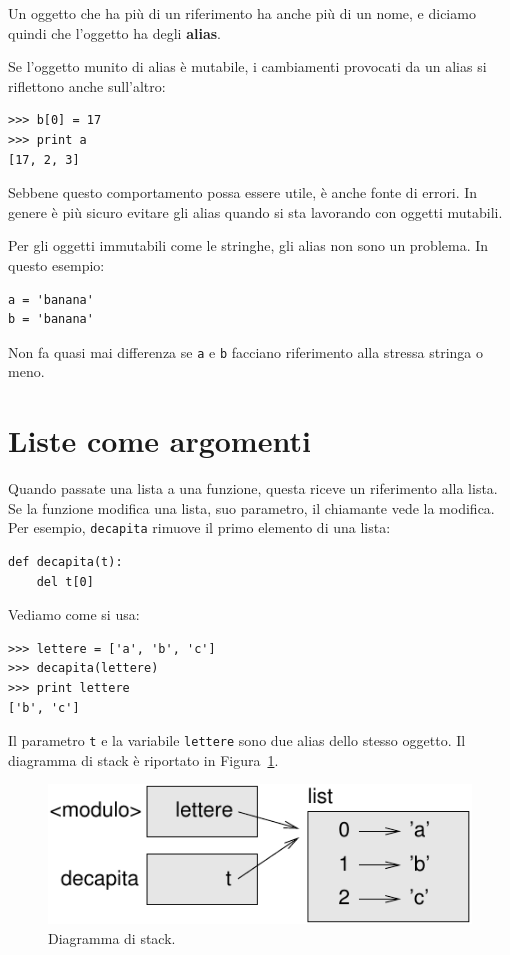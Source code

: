 \documentclass[10pt]{book}
\begin{document}
Un oggetto che ha più di un riferimento ha anche più di un nome, e diciamo quindi che l'oggetto ha degli {\bf alias}.

Se l'oggetto munito di alias è mutabile, i cambiamenti provocati da un alias si riflettono anche sull'altro:

\begin{verbatim}
>>> b[0] = 17
>>> print a
[17, 2, 3]
\end{verbatim}
%
Sebbene questo comportamento possa essere utile, è anche fonte di errori. In genere è più sicuro evitare gli alias quando si sta lavorando con oggetti mutabili.

Per gli oggetti immutabili come le stringhe, gli alias non sono un problema. In questo esempio:

\begin{verbatim}
a = 'banana'
b = 'banana'
\end{verbatim}
%
Non fa quasi mai differenza se {\tt a} e {\tt b} facciano riferimento alla stressa stringa o meno.


\section{Liste come argomenti}
\label{list.arguments}

Quando passate una lista a una funzione, questa riceve un riferimento alla lista. Se la funzione modifica una lista, suo parametro, il chiamante vede la modifica. Per esempio, \verb"decapita" rimuove il primo elemento di una lista:

\begin{verbatim}
def decapita(t):
    del t[0]
\end{verbatim}
%
Vediamo come si usa:

\begin{verbatim}
>>> lettere = ['a', 'b', 'c']
>>> decapita(lettere)
>>> print lettere
['b', 'c']
\end{verbatim}
%
Il parametro {\tt t} e la variabile {\tt lettere} sono due alias dello stesso oggetto. Il diagramma di stack è riportato in Figura~\ref{fig.stack5}.

\begin{figure}
\centerline
{\includegraphics[scale=0.8]{figs/stack5.pdf}}
\caption{Diagramma di stack.}
\label{fig.stack5}
\end{figure}
\end{document}
